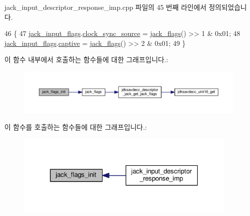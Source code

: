 jack\+\_\+input\+\_\+descriptor\+\_\+response\+\_\+imp.\+cpp 파일의 45 번째 라인에서 정의되었습니다.


\begin{DoxyCode}
46 \{
47     \hyperlink{classavdecc__lib_1_1jack__input__descriptor__response__imp_a279c007c1e27517923deabafa009d1d7}{jack\_input\_flags}.\hyperlink{structavdecc__lib_1_1jack__input__descriptor__response__imp_1_1jack__input__desc__jack__flags_a88fddf8263d330f180256cd941f9a329}{clock\_sync\_source} = 
      \hyperlink{classavdecc__lib_1_1jack__input__descriptor__response__imp_a948ec24f1eab1560f4b8d7a3cc284437}{jack\_flags}() >> 1 & 0x01;
48     \hyperlink{classavdecc__lib_1_1jack__input__descriptor__response__imp_a279c007c1e27517923deabafa009d1d7}{jack\_input\_flags}.\hyperlink{structavdecc__lib_1_1jack__input__descriptor__response__imp_1_1jack__input__desc__jack__flags_a5402c79a5c779cdf48abab5879fb8de4}{captive} = \hyperlink{classavdecc__lib_1_1jack__input__descriptor__response__imp_a948ec24f1eab1560f4b8d7a3cc284437}{jack\_flags}() >> 2 & 0x01;
49 \}
\end{DoxyCode}


이 함수 내부에서 호출하는 함수들에 대한 그래프입니다.\+:
\nopagebreak
\begin{figure}[H]
\begin{center}
\leavevmode
\includegraphics[width=350pt]{classavdecc__lib_1_1jack__input__descriptor__response__imp_a6de95e6c9b0a71154f1451a6a19da19f_cgraph}
\end{center}
\end{figure}




이 함수를 호출하는 함수들에 대한 그래프입니다.\+:
\nopagebreak
\begin{figure}[H]
\begin{center}
\leavevmode
\includegraphics[width=304pt]{classavdecc__lib_1_1jack__input__descriptor__response__imp_a6de95e6c9b0a71154f1451a6a19da19f_icgraph}
\end{center}
\end{figure}


